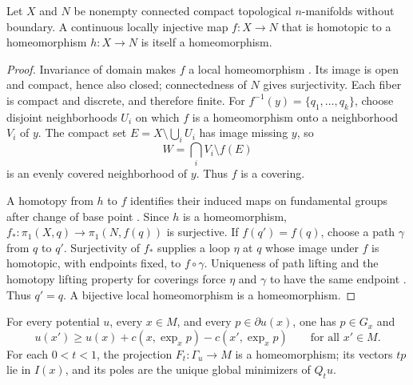 \begin{lemma}
\label{lem:covering-homeomorphism}
Let $X$ and $N$ be nonempty connected compact topological
$n$-manifolds without boundary. A continuous locally injective map
$f:X\to N$ that is homotopic to a homeomorphism $h:X\to N$
is itself a homeomorphism.
\end{lemma}

\begin{proof}
Invariance of domain makes $f$ a local homeomorphism
\cite[Theorem~2B.3]{Hatcher2002}. Its image is open and compact,
hence also closed; connectedness of $N$ gives surjectivity.
Each fiber is compact and discrete, and therefore finite.
For $f^{-1}(y)=\{q_1,\ldots,q_k\}$, choose disjoint neighborhoods
$U_i$ on which $f$ is a homeomorphism onto a neighborhood $V_i$
of $y$. The compact set $E=X\setminus\bigcup_i U_i$ has image
missing $y$, so
\[
 W=\bigcap_i V_i\setminus f(E)
\]
is an evenly covered neighborhood of $y$. Thus $f$ is a covering.

A homotopy from $h$ to $f$ identifies their induced maps on fundamental
groups after change of base point \cite[Lemma~1.19]{Hatcher2002}.
Since $h$ is a homeomorphism, $f_*:\pi_1(X,q)\to\pi_1(N,f(q))$
is surjective. If $f(q')=f(q)$, choose a path $\gamma$ from $q$ to
$q'$. Surjectivity of $f_*$ supplies a loop $\eta$ at $q$ whose
image under $f$ is homotopic, with endpoints fixed, to $f\circ\gamma$.
Uniqueness of path lifting and the homotopy lifting property for
coverings force $\eta$ and $\gamma$ to have the same endpoint
\cite[Proposition~1.30]{Hatcher2002}. Thus $q'=q$.
A bijective local homeomorphism is a homeomorphism.
\end{proof}

\begin{theorem}
\label{geo:support}
For every potential $u$, every $x\in M$, and every
$p\in\partial u(x)$, one has $p\in G_x$ and
\begin{equation}
 \label{geo:global-support}
 u(x')\geq u(x)+c(x,\exp_xp)-c(x',\exp_xp)
 \qquad\text{for all }x'\in M.
\end{equation}
For each $0<t<1$, the projection $F_t:\Gamma_u\to M$ is a
homeomorphism; its vectors $tp$ lie in $I(x)$, and its poles are the
unique global minimizers of $Q_tu$.
\end{theorem}

